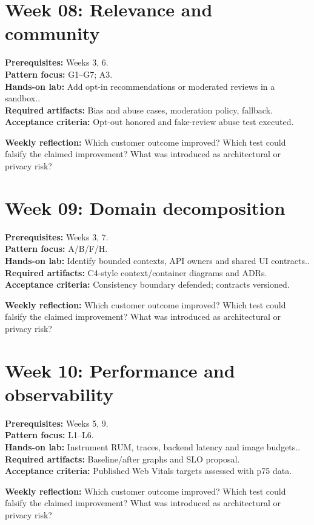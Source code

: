 \documentclass[11pt]{article}
\begin{document}
\section{Week 08: Relevance and community}
\textbf{Prerequisites:} Weeks 3, 6.\\
\textbf{Pattern focus:} G1--G7; A3.\\
\textbf{Hands-on lab:} Add opt-in recommendations or moderated reviews in a sandbox..\\
\textbf{Required artifacts:} Bias and abuse cases, moderation policy, fallback.\\
\textbf{Acceptance criteria:} Opt-out honored and fake-review abuse test executed.
\begin{decisionbox}\textbf{Weekly reflection:} Which customer outcome improved? Which test could falsify the claimed improvement? What was introduced as architectural or privacy risk?\end{decisionbox}
\section{Week 09: Domain decomposition}
\textbf{Prerequisites:} Weeks 3, 7.\\
\textbf{Pattern focus:} A/B/F/H.\\
\textbf{Hands-on lab:} Identify bounded contexts, API owners and shared UI contracts..\\
\textbf{Required artifacts:} C4-style context/container diagrams and ADRs.\\
\textbf{Acceptance criteria:} Consistency boundary defended; contracts versioned.
\begin{decisionbox}\textbf{Weekly reflection:} Which customer outcome improved? Which test could falsify the claimed improvement? What was introduced as architectural or privacy risk?\end{decisionbox}
\section{Week 10: Performance and observability}
\textbf{Prerequisites:} Weeks 5, 9.\\
\textbf{Pattern focus:} L1--L6.\\
\textbf{Hands-on lab:} Instrument RUM, traces, backend latency and image budgets..\\
\textbf{Required artifacts:} Baseline/after graphs and SLO proposal.\\
\textbf{Acceptance criteria:} Published Web Vitals targets assessed with p75 data.
\begin{decisionbox}\textbf{Weekly reflection:} Which customer outcome improved? Which test could falsify the claimed improvement? What was introduced as architectural or privacy risk?\end{decisionbox}
\end{document}
